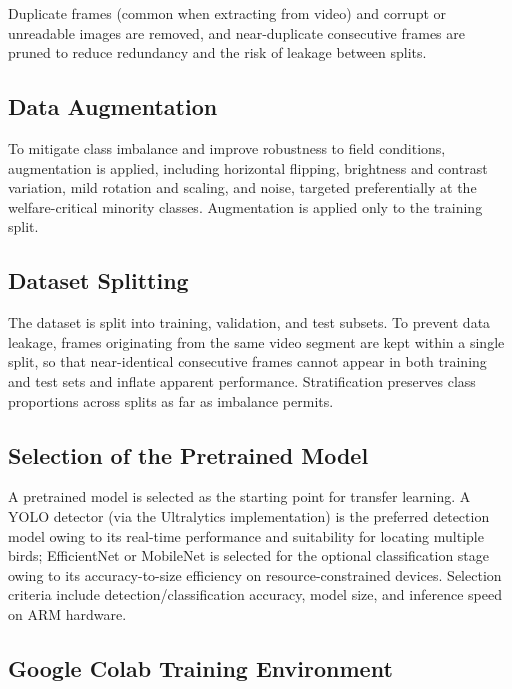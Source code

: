 \documentclass[12pt,a4paper]{report}
\begin{document}
Duplicate frames (common when extracting from video) and corrupt or unreadable images are removed, and near-duplicate consecutive frames are pruned to reduce redundancy and the risk of leakage between splits.

\subsection{Data Augmentation}

To mitigate class imbalance and improve robustness to field conditions, augmentation is applied, including horizontal flipping, brightness and contrast variation, mild rotation and scaling, and noise, targeted preferentially at the welfare-critical minority classes. Augmentation is applied only to the training split.

\subsection{Dataset Splitting}

The dataset is split into training, validation, and test subsets. To prevent data leakage, frames originating from the same video segment are kept within a single split, so that near-identical consecutive frames cannot appear in both training and test sets and inflate apparent performance. Stratification preserves class proportions across splits as far as imbalance permits.

\subsection{Selection of the Pretrained Model}

A pretrained model is selected as the starting point for transfer learning. A YOLO detector (via the Ultralytics implementation) is the preferred detection model owing to its real-time performance and suitability for locating multiple birds; EfficientNet or MobileNet is selected for the optional classification stage owing to its accuracy-to-size efficiency on resource-constrained devices. Selection criteria include detection/classification accuracy, model size, and inference speed on ARM hardware.

\subsection{Google Colab Training Environment}
\end{document}
